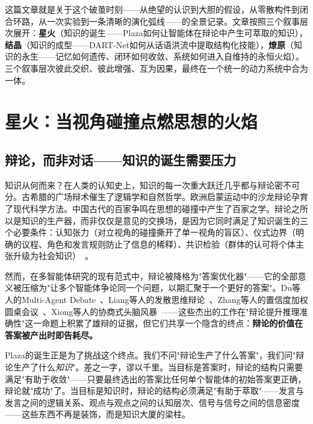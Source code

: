 \documentclass[twocolumn,10.5pt]{ctexart}
\begin{document}
这篇文章就是关于这个破茧时刻——从绝望的认识到大胆的假设，从零散构件到闭合环路，从一次实验到一条清晰的演化弧线——的全景记录。文章按照三个叙事层次展开：\textbf{星火}（知识的诞生——Plaza如何让智能体在辩论中产生可萃取的知识），\textbf{结晶}（知识的成型——DART-Net如何从话语洪流中提取结构化技能），\textbf{燎原}（知识的永生——记忆如何遗传、闭环如何收敛、系统如何进入自维持的永恒火焰）。三个叙事层次彼此交织、彼此增强、互为因果，最终在一个统一的动力系统中合为一体。

\section{星火：当视角碰撞点燃思想的火焰}

\subsection{辩论，而非对话——知识的诞生需要压力}

知识从何而来？在人类的认知史上，知识的每一次重大跃迁几乎都与辩论密不可分。古希腊的广场辩术催生了逻辑学和自然哲学。欧洲启蒙运动中的沙龙辩论孕育了现代科学方法。中国古代的百家争鸣在思想的碰撞中产生了百家之学。辩论之所以是知识的生产器，而非仅仅是意见的交换场，是因为它同时满足了知识诞生的三个必要条件：认知张力（对立视角的碰撞撕开了单一视角的盲区）、仪式边界（明确的议程、角色和发言规则防止了信息的稀释）、共识检验（群体的认可将个体主张升级为社会知识）~\cite{kaner2014facilitator}。

然而，在多智能体研究的现有范式中，辩论被降格为"答案优化器"——它的全部意义被压缩为"让多个智能体争论同一个问题，以期汇聚于一个更好的答案"。Du等人的Multi-Agent Debate~\cite{du2023improving}、Liang等人的发散思维辩论~\cite{liang2023encouraging}、Zhang等人的置信度加权圆桌会议~\cite{zhang2024reconcile}、Xiong等人的协商式头脑风暴~\cite{xiong2023dubi}——这些杰出的工作在"辩论提升推理准确性"这一命题上积累了雄辩的证据，但它们共享一个隐含的终点：\textbf{辩论的价值在答案被产出时即告耗尽。}

Plaza的诞生正是为了挑战这个终点。我们不问"辩论生产了什么答案"，我们问"辩论生产了什么\emph{知识}"。差之一字，谬以千里。当目标是答案时，辩论的结构只需要满足"有助于收敛"——只要最终选出的答案比任何单个智能体的初始答案更正确，辩论就"成功"了。当目标是知识时，辩论的结构必须满足"有助于萃取"——发言与发言之间的逻辑关系、观点与观点之间的认知层次、信号与信号之间的信息密度——这些东西不再是装饰，而是知识大厦的梁柱。
\end{document}
